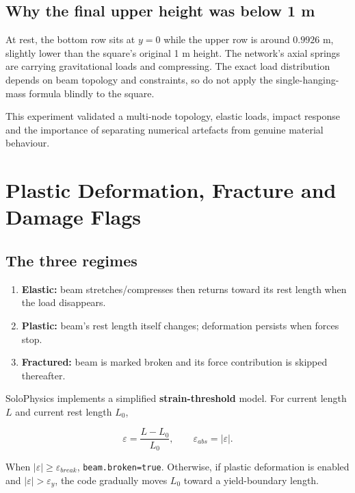 \documentclass[
  10pt,
  a4paper,
]{article}
\providecommand{\tightlist}{%
  \setlength{\itemsep}{0pt}\setlength{\parskip}{0pt}}
\begin{document}
\subsection{Why the final upper height was below 1
m}\label{why-the-final-upper-height-was-below-1-m}

At rest, the bottom row sits at \(y=0\) while the upper row is around
\(0.9926\) m, slightly lower than the square's original 1 m height. The
network's axial springs are carrying gravitational loads and
compressing. The exact load distribution depends on beam topology and
constraints, so do not apply the single-hanging-mass formula blindly to
the square.

This experiment validated a multi-node topology, elastic loads, impact
response and the importance of separating numerical artefacts from
genuine material behaviour.

\newpage

\section{Plastic Deformation, Fracture and Damage
Flags}\label{plastic-deformation-fracture-and-damage-flags}

\subsection{The three regimes}\label{the-three-regimes}

\begin{enumerate}
\def\labelenumi{\arabic{enumi}.}
\tightlist
\item
  \textbf{Elastic:} beam stretches/compresses then returns toward its
  rest length when the load disappears.
\item
  \textbf{Plastic:} beam's rest length itself changes; deformation
  persists when forces stop.
\item
  \textbf{Fractured:} beam is marked broken and its force contribution
  is skipped thereafter.
\end{enumerate}

SoloPhysics implements a simplified \textbf{strain-threshold} model. For
current length \(L\) and current rest length \(L_0\),

\[\varepsilon=\frac{L-L_0}{L_0},\qquad \varepsilon_{abs}=|\varepsilon|.\]

When \(|\varepsilon|\ge\varepsilon_{break}\), \texttt{beam.broken=true}.
Otherwise, if plastic deformation is enabled and
\(|\varepsilon|>\varepsilon_y\), the code gradually moves \(L_0\) toward
a yield-boundary length.
\end{document}
